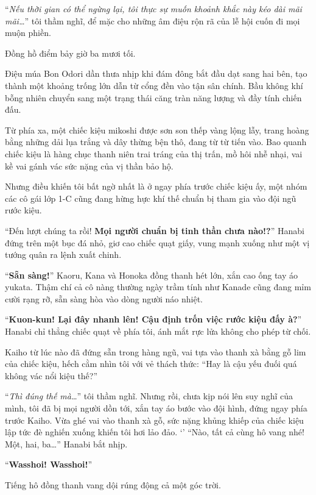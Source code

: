 \documentclass[../main.tex]{subfiles}
\begin{document}
``\textit{Nếu thời gian có thể ngừng lại, tôi thực sự muốn khoảnh khắc này kéo dài mãi mãi\dots}'' tôi thầm nghĩ, để mặc cho những âm điệu rộn rã của lễ hội cuốn đi mọi muộn phiền.

\ct

Đồng hồ điểm bảy giờ ba mươi tối.

Điệu múa Bon Odori dần thưa nhịp khi đám đông bắt đầu dạt sang hai bên, tạo thành một khoảng trống lớn dẫn từ cổng đền vào tận sân chính. Bầu không khí bỗng nhiên chuyển sang một trạng thái căng tràn năng lượng và đầy tính chiến đấu.

Từ phía xa, một chiếc kiệu mikoshi được sơn son thếp vàng lộng lẫy, trang hoàng bằng những dải lụa trắng và dây thừng bện thô, đang từ từ tiến vào. Bao quanh chiếc kiệu là hàng chục thanh niên trai tráng của thị trấn, mồ hôi nhễ nhại, vai kề vai gánh vác sức nặng của vị thần bảo hộ.

Nhưng điều khiến tôi bất ngờ nhất là ở ngay phía trước chiếc kiệu ấy, một nhóm các cô gái lớp 1-C cũng đang hừng hực khí thế chuẩn bị tham gia vào đội ngũ rước kiệu.

``Đến lượt chúng ta rồi! \textbf{Mọi người chuẩn bị tinh thần chưa nào!?}'' Hanabi đứng trên một bục đá nhỏ, giơ cao chiếc quạt giấy, vung mạnh xuống như một vị tướng quân ra lệnh xuất chinh.

``\textbf{Sẵn sàng!}'' Kaoru, Kana và Honoka đồng thanh hét lớn, xắn cao ống tay áo yukata. Thậm chí cả cô nàng thường ngày trầm tính như Kanade cũng đang mỉm cười rạng rỡ, sẵn sàng hòa vào dòng người náo nhiệt.

``\textbf{Kuon-kun! Lại đây nhanh lên! Cậu định trốn việc rước kiệu đấy à?}'' Hanabi chỉ thẳng chiếc quạt về phía tôi, ánh mắt rực lửa không cho phép từ chối.

Kaiho từ lúc nào đã đứng sẵn trong hàng ngũ, vai tựa vào thanh xà bằng gỗ lim của chiếc kiệu, hếch cằm nhìn tôi với vẻ thách thức: ``Hay là cậu yếu đuối quá không vác nổi kiệu thế?''

``\textit{Thì đúng thế mà\dots}'' tôi thầm nghĩ. Nhưng rồi, chưa kịp nói lên suy nghĩ của mình, tôi đã bị mọi người dồn tới, xắn tay áo bước vào đội hình, đứng ngay phía trước Kaiho. Vừa ghé vai vào thanh xà gỗ, sức nặng khủng khiếp của chiếc kiệu lập tức đè nghiến xuống khiến tôi hơi lảo đảo.
`'
``Nào, tất cả cùng hô vang nhé! Một, hai, ba\dots'' Hanabi bắt nhịp.

``\textbf{Wasshoi! Wasshoi!}''

Tiếng hô đồng thanh vang dội rúng động cả một góc trời.
\end{document}
